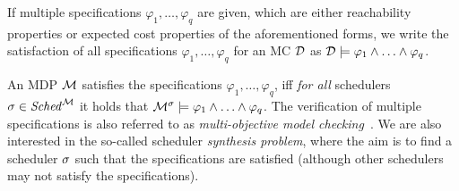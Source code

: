 If multiple specifications $\varphi_1,\ldots,\varphi_q$ are given, which are either reachability properties or expected cost properties of the aforementioned forms, we write the satisfaction of all specifications $\varphi_1,\ldots,\varphi_q$ for an MC $\mathcal{D}$ as $\mathcal{D}\models\varphi_1\land\ldots\land\varphi_q$. 

An MDP $\mathcal{M}$ satisfies the specifications $\varphi_1,\ldots,\varphi_q$, iff \emph{for all} schedulers $\sigma\in\mathit{Sched}^{\mathcal{M}}$ it holds that $\mathcal{M}^{\sigma}\models\varphi_1\wedge\ldots\wedge\varphi_q$. The verification of multiple specifications is also referred to as \emph{multi-objective model checking}~\cite{DBLP:journals/lmcs/EtessamiKVY08,DBLP:conf/atva/ForejtKP12}.
We are also interested in the so-called scheduler \emph{synthesis problem}, where the aim is to find a scheduler $\sigma$ such that the specifications are satisfied (although other schedulers may not satisfy the specifications).





%


%




